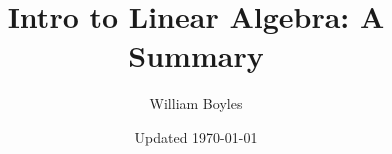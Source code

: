 


	\title{Intro to Linear Algebra: A Summary}
	\author{William Boyles}
	\date{Updated \today}
	
	\frontmatter
		\maketitle
		\tableofcontents
		
	\mainmatter
	
	\appendix
	
	\backmatter
